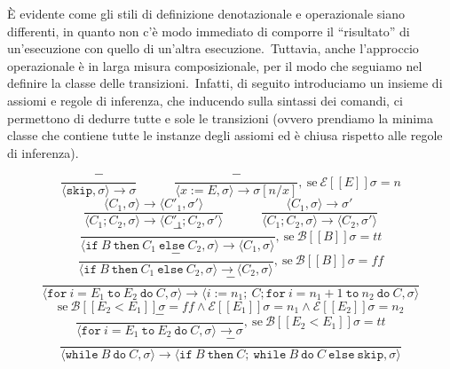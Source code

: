 È evidente come gli stili di definizione denotazionale e operazionale siano differenti, in quanto non c'è modo immediato di comporre il ``risultato'' di un'esecuzione con quello di un'altra esecuzione.\
Tuttavia, anche l'approccio operazionale è in larga misura composizionale, per il modo che seguiamo nel definire la classe delle transizioni.\
Infatti, di seguito introduciamo un insieme di assiomi e regole di inferenza, che inducendo sulla sintassi dei comandi, ci permettono di dedurre tutte e sole le transizioni (ovvero prendiamo la minima classe che contiene tutte le instanze degli assiomi ed è chiusa rispetto alle regole di inferenza).

\[\frac{-}{\langle \mathtt{skip}, \sigma\rangle \rightarrow \sigma}\quad \qquad \frac{-}{\langle x:=E, \sigma\rangle \rightarrow \sigma[n/x]},\ \mathrm{se}\ \mathcal{E}[\![E]\!]\sigma = n\]
\[\frac{\langle C_1, \sigma\rangle \rightarrow \langle C'_1, \sigma'\rangle}{\langle C_1; C_2, \sigma\rangle \rightarrow \langle C'_1; C_2,\sigma'\rangle}\quad \qquad \frac{\langle C_1, \sigma\rangle \rightarrow \sigma'}{\langle C_1; C_2, \sigma\rangle \rightarrow \langle C_2, \sigma'\rangle}\]
\[\frac{-}{\langle \mathtt{if}\ B\ \mathtt{then}\ C_1\ \mathtt{else}\ C_2, \sigma\rangle \rightarrow \langle C_1, \sigma\rangle},\ \mathrm{se}\ \mathcal{B}[\![B]\!]\sigma = \mathit{tt}\]
\[\frac{-}{\langle \mathtt{if}\ B\ \mathtt{then}\ C_1\ \mathtt{else}\ C_2, \sigma\rangle \rightarrow \langle C_2, \sigma\rangle},\ \mathrm{se}\ \mathcal{B}[\![B]\!]\sigma = \mathit{ff}\]
\[\frac{-}{\langle \mathtt{for}\ i=E_1\ \mathtt{to}\ E_2\ \mathtt{do}\ C, \sigma\rangle \rightarrow \langle i:= n_1;\ C; \mathtt{for}\ i = n_1 + 1\ \mathtt{to}\ n_2\ \mathtt{do}\ C, \sigma \rangle}\]
\[\mathrm{se}\ \mathcal{B}[\![E_2 < E_1]\!]\sigma = \mathit{ff} \land \mathcal{E}[\![E_1]\!]\sigma = n_1 \land \mathcal{E}[\![E_2]\!]\sigma = n_2\]
\[\frac{-}{\langle \mathtt{for}\ i=E_1\ \mathtt{to}\ E_2\ \mathtt{do}\ C, \sigma\rangle \rightarrow \sigma},\ \mathrm{se}\ \mathcal{B}[\![E_2 < E_1]\!]\sigma = \mathit{tt}\]
\[\frac{-}{\langle \mathtt{while}\ B\ \mathtt{do}\ C, \sigma\rangle \rightarrow \langle \mathtt{if}\ B\ \mathtt{then}\ C;\ \mathtt{while}\ B\ \mathtt{do}\ C\ \mathtt{else\ skip}, \sigma \rangle}\]
